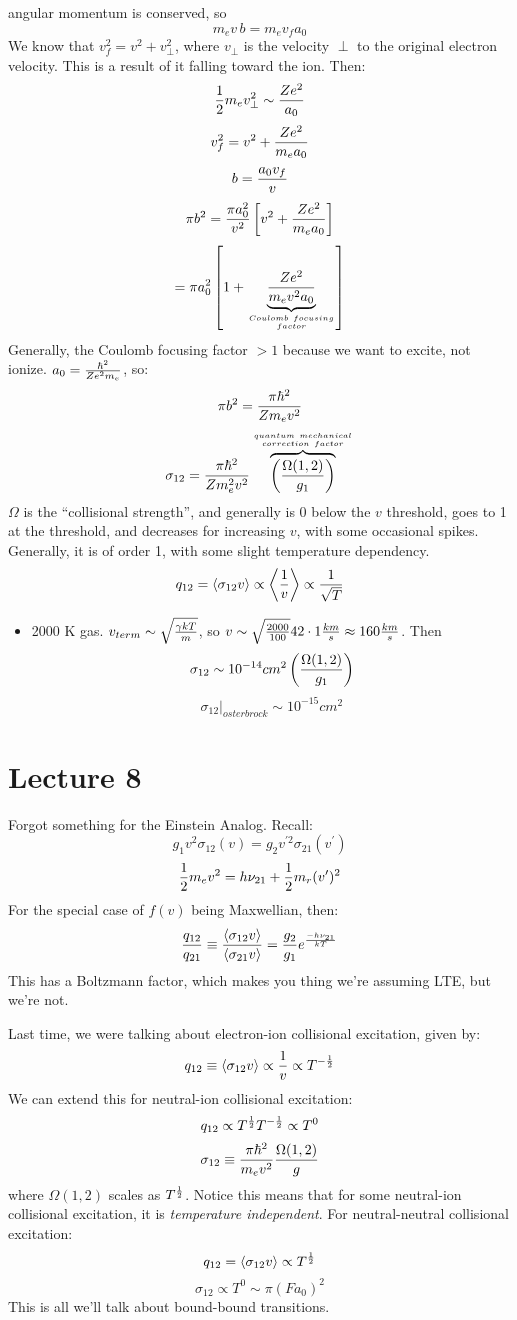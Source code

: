 \documentclass[11pt]{article}
\def\hf{{1 \over 2}}
\def\inv#1{{1 \over #1}}
\def\mean#1{\left\langle #1\right\rangle}
\def\sigot{\sigma_{12}}
\def\eval#1{\big|_{#1}}
\begin{document}
angular momentum is conserved, so 
$$m_ev\,b=m_ev_fa_0$$
We know that $v_f^2 = v^2 + v_\perp^2$, where $v_\perp$ is the velocity
$\perp$ to the original electron velocity.  This is a result of it falling
toward the ion.  Then:
$$\hf m_ev_\perp^2 \sim {Ze^2\over a_0}$$
$$v_f^2 = v^2 + {Ze^2\over m_ea_0}$$
$$b={a_0v_f\over v}$$
$$\pi b^2 = {\pi a_0^2\over v^2}\left[v^2+{Ze^2\over m_ea_0}\right]$$
$$= \pi a_0^2\left[1+\underbrace{Ze^2\over m_ev^2a_0}_{Coulomb\ focusing\atop 
factor}\right]$$
Generally, the Coulomb focusing factor $>1$ because we want to excite, not
ionize.  $a_0={\hbar^2\over Ze^2m_e}$, so:
$$\pi b^2 = {\pi\hbar^2\over Z m_ev^2}$$
$$\sigot = {\pi\hbar^2\over Z m_e^2v^2}
\overbrace{\left(\Omega(1,2)\over 
g_1\right)}^{quantum\ mechanical\atop correction\ factor}$$
$\Omega$ is the ``collisional strength'', and generally is 0 below the
$v$ threshold, goes to 1 at the threshold, and decreases for increasing
$v$, with some occasional spikes.  Generally, it is of order 1, with some
slight temperature dependency.
$$\qot=\mean{\sigot v} \propto \mean{\inv{v}} \propto \inv{\sqrt{T}}$$
\begin{itemize}
\item 2000 K gas.  $v_{term} \sim \sqrt{\gamma kT\over m}$, so 
$v\sim \sqrt{2000\over 100}42\cdot 1{km\over s} \approx 160{km\over s}$. Then
$$\sigot \sim 10^{-14}cm^2\left({\Omega(1,2)\over g_1}\right)$$
$$\sigot\eval{osterbrock} \sim 10^{-15} cm^2$$
\end{itemize}

\section*{ Lecture 8 }

Forgot something for the Einstein Analog.  Recall:
$$g_1v^2\sigma_{12}(v)=g_2v^{\prime2}\sigma_{21}(v^\prime)$$
$$\hf m_ev^2=h\nu_{21}+\hf m_r(v^\prime)^2$$
For the special case of $f(v)$ being Maxwellian, then:
$${q_{12}\over q_{21}}\equiv{\mean{\sigma_{12}v}\over\mean{\sigma_{21}v}}
={g_2\over g_1}e^{-h\nu_{21}\over kT}$$
This has a Boltzmann factor, which makes you thing we're assuming LTE, but
we're not. \par
Last time, we were talking about electron-ion collisional excitation, given by:
$$\qot\equiv\mean{\sigot v}\propto\inv{v}\propto T^{-\hf}$$
We can extend this for neutral-ion collisional excitation:
$$\qot \propto T^\hf T^{-\hf} \propto T^0$$
$$\sigot\equiv{\pi\hbar^2\over m_ev^2}{\Omega(1,2)\over g}$$
where $\Omega(1,2)$ scales as $T^\hf$.  Notice this means that for some
neutral-ion collisional excitation, it is {\it temperature independent}.
For neutral-neutral collisional excitation:
$$\qot=\mean{\sigot v}\propto T^\hf$$
$$\sigot\propto T^0\sim \pi(Fa_0)^2$$
This is all we'll talk about bound-bound transitions.
\end{document}
